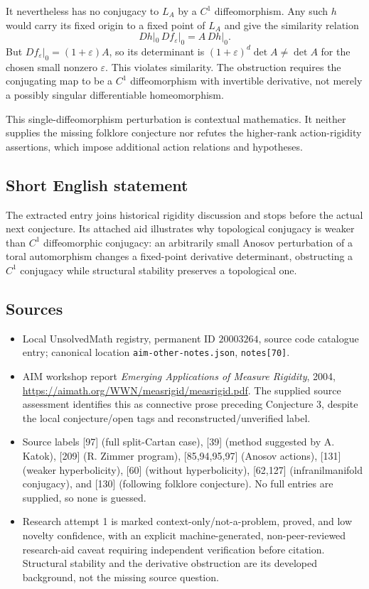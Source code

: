 \documentclass[11pt]{article}
\newcommand{\eps}{\varepsilon}
\begin{document}
It nevertheless has no conjugacy to $L_A$ by a $C^1$ diffeomorphism. Any such $h$ would carry its fixed origin to a fixed point of $L_A$ and give the similarity relation
\[
 Dh|_0\,Df_\eps|_0=A\,Dh|_0.
\]
But $Df_\eps|_0=(1+\eps)A$, so its determinant is $(1+\eps)^d\det A\ne\det A$ for the chosen small nonzero $\eps$. This violates similarity. The obstruction requires the conjugating map to be a $C^1$ diffeomorphism with invertible derivative, not merely a possibly singular differentiable homeomorphism.

This single-diffeomorphism perturbation is contextual mathematics. It neither supplies the missing folklore conjecture nor refutes the higher-rank action-rigidity assertions, which impose additional action relations and hypotheses.
\subsection{Short English statement}
The extracted entry joins historical rigidity discussion and stops before the actual next conjecture. Its attached aid illustrates why topological conjugacy is weaker than $C^1$ diffeomorphic conjugacy: an arbitrarily small Anosov perturbation of a toral automorphism changes a fixed-point derivative determinant, obstructing a $C^1$ conjugacy while structural stability preserves a topological one.
\subsection{Sources}
\begin{itemize}
\item Local UnsolvedMath registry, permanent ID $20003264$, source code catalogue entry; canonical location \texttt{aim-other-notes.json}, \texttt{notes[70]}.
\item AIM workshop report \emph{Emerging Applications of Measure Rigidity}, 2004, \url{https://aimath.org/WWN/measrigid/measrigid.pdf}. The supplied source assessment identifies this as connective prose preceding Conjecture 3, despite the local conjecture/open tags and reconstructed/unverified label.
\item Source labels [97] (full split-Cartan case), [39] (method suggested by A. Katok), [209] (R. Zimmer program), [85,94,95,97] (Anosov actions), [131] (weaker hyperbolicity), [60] (without hyperbolicity), [62,127] (infranilmanifold conjugacy), and [130] (following folklore conjecture). No full entries are supplied, so none is guessed.
\item Research attempt 1 is marked context-only/not-a-problem, proved, and low novelty confidence, with an explicit machine-generated, non-peer-reviewed research-aid caveat requiring independent verification before citation. Structural stability and the derivative obstruction are its developed background, not the missing source question.
\end{itemize}
\end{document}

